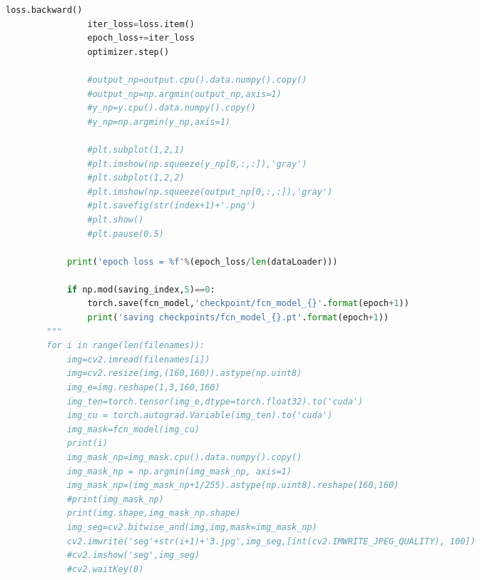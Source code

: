 \documentclass[supercite]{HustGraduPaper}
\begin{document}
\begin{sloppypar}
\begin{appendices}
\begin{spacing}{1.25}
\begin{lstlisting}[language=python]
                loss.backward()
                iter_loss=loss.item()
                epoch_loss+=iter_loss
                optimizer.step()
                
                #output_np=output.cpu().data.numpy().copy()
                #output_np=np.argmin(output_np,axis=1)
                #y_np=y.cpu().data.numpy().copy()
                #y_np=np.argmin(y_np,axis=1)
                
                #plt.subplot(1,2,1)
                #plt.imshow(np.squeeze(y_np[0,:,:]),'gray')
                #plt.subplot(1,2,2)
                #plt.imshow(np.squeeze(output_np[0,:,:]),'gray')
                #plt.savefig(str(index+1)+'.png')
                #plt.show()
                #plt.pause(0.5)
    
            print('epoch loss = %f'%(epoch_loss/len(dataLoader)))
    
            if np.mod(saving_index,5)==0:
                torch.save(fcn_model,'checkpoint/fcn_model_{}'.format(epoch+1))
                print('saving checkpoints/fcn_model_{}.pt'.format(epoch+1))
        """
        for i in range(len(filenames)):
            img=cv2.imread(filenames[i])
            img=cv2.resize(img,(160,160)).astype(np.uint8)
            img_e=img.reshape(1,3,160,160)
            img_ten=torch.tensor(img_e,dtype=torch.float32).to('cuda')
            img_cu = torch.autograd.Variable(img_ten).to('cuda')
            img_mask=fcn_model(img_cu)
            print(i)
            img_mask_np=img_mask.cpu().data.numpy().copy()
            img_mask_np = np.argmin(img_mask_np, axis=1)
            img_mask_np=(img_mask_np+1/255).astype(np.uint8).reshape(160,160)
            #print(img_mask_np)
            print(img.shape,img_mask_np.shape)
            img_seg=cv2.bitwise_and(img,img,mask=img_mask_np)
            cv2.imwrite('seg'+str(i+1)+'3.jpg',img_seg,[int(cv2.IMWRITE_JPEG_QUALITY), 100])
            #cv2.imshow('seg',img_seg)
            #cv2.waitKey(0)
  \end{lstlisting}
\end{spacing}
    \end{appendices}
\end{sloppypar}
\end{document}
